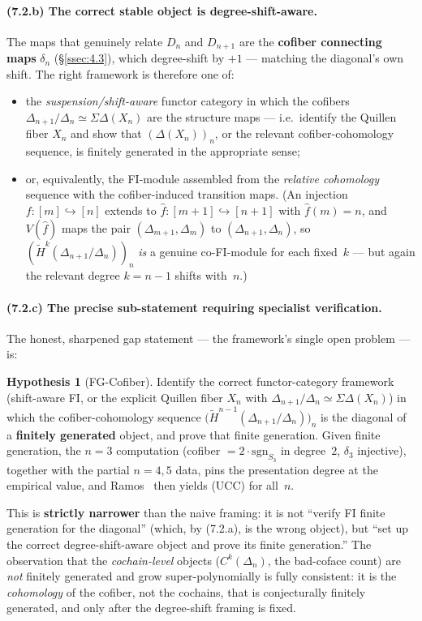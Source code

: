 \documentclass[11pt,reqno]{amsart}
\theoremstyle{plain}
\theoremstyle{definition}
\newtheorem{hypothesis}[theorem]{Hypothesis}
\newcommand{\Hred}{\widetilde H}
\newcommand{\sgn}{\mathrm{sgn}}
\newcommand{\UCC}{\textup{(UCC)}}
\begin{document}
\paragraph{(7.2.b) The correct stable object is degree-shift-aware.}
The maps that genuinely relate $D_n$ and $D_{n+1}$ are the
\textbf{cofiber connecting maps} $\delta_n$ (\S\ref{ssec:4.3}), which
degree-shift by $+1$ --- matching the diagonal's own shift. The right
framework is therefore one of:
\begin{itemize}[leftmargin=1.6em]
  \item the \emph{suspension/shift-aware} functor category in which the
        cofibers $\Delta_{n+1}/\Delta_n\simeq\Sigma\Delta(X_n)$ are the
        structure maps --- i.e.\ identify the Quillen fiber $X_n$ and
        show that $(\Delta(X_n))_n$, or the relevant cofiber-cohomology
        sequence, is finitely generated in the appropriate sense;
  \item or, equivalently, the FI-module assembled from the
        \emph{relative cohomology} sequence with the cofiber-induced
        transition maps. (An injection $f:[m]\hookrightarrow[n]$ extends
        to $\hat f:[m+1]\hookrightarrow[n+1]$ with $\hat f(m)=n$, and
        $V(\hat f)$ maps the pair $(\Delta_{m+1},\Delta_m)$ to
        $(\Delta_{n+1},\Delta_n)$, so
        $(\Hred^k(\Delta_{n+1}/\Delta_n))_n$ \emph{is} a genuine
        co-FI-module for each fixed~$k$ --- but again the relevant
        degree $k=n-1$ shifts with~$n$.)
\end{itemize}

\paragraph{(7.2.c) The precise sub-statement requiring specialist
verification.}
The honest, sharpened gap statement --- the framework's single open
problem --- is:
\begin{hypothesis}[FG-Cofiber]\label{hyp:fgcofiber}
Identify the correct functor-category framework (shift-aware FI, or the
explicit Quillen fiber $X_n$ with
$\Delta_{n+1}/\Delta_n\simeq\Sigma\Delta(X_n)$) in which the
cofiber-cohomology sequence
$\bigl(\Hred^{n-1}(\Delta_{n+1}/\Delta_n)\bigr)_n$ is the diagonal of a
\textbf{finitely generated} object, and prove that finite generation.
Given finite generation, the $n=3$ computation (cofiber
$=2\cdot\sgn_{S_3}$ in degree~$2$, $\delta_3$ injective), together with
the partial $n=4,5$ data, pins the presentation degree at the empirical
value, and Ramos~\cite{Ramos2017} then yields \UCC{} for all~$n$.
\end{hypothesis}
This is \textbf{strictly narrower} than the naive framing: it is not
``verify FI finite generation for the diagonal'' (which, by (7.2.a), is
the wrong object), but ``set up the correct degree-shift-aware object
and prove its finite generation.'' The observation that the
\emph{cochain-level} objects ($C^k(\Delta_n)$, the bad-coface count)
are \emph{not} finitely generated and grow super-polynomially is fully
consistent: it is the \emph{cohomology} of the cofiber, not the
cochains, that is conjecturally finitely generated, and only after the
degree-shift framing is fixed.
\end{document}
